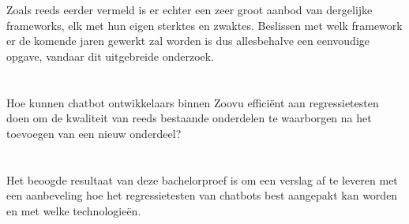 Zoals reeds eerder vermeld is er echter een zeer groot aanbod van dergelijke frameworks, elk met hun eigen sterktes en zwaktes. Beslissen met welk framework er de komende jaren gewerkt zal worden is dus allesbehalve een eenvoudige opgave, vandaar dit uitgebreide onderzoek.

\section{}
\label{sec:onderzoeksvraag}


Hoe kunnen chatbot ontwikkelaars binnen Zoovu efficiënt aan regressietesten doen
om de kwaliteit van reeds bestaande onderdelen te waarborgen na het toevoegen
van een nieuw onderdeel?

\section{}
\label{sec:onderzoeksdoelstelling}


Het beoogde resultaat van deze bachelorproef is om een verslag af te leveren met
een aanbeveling hoe het regressietesten van chatbots best aangepakt kan worden
en met welke technologieën. 

\section{}
\label{sec:opzet-bachelorproef}


